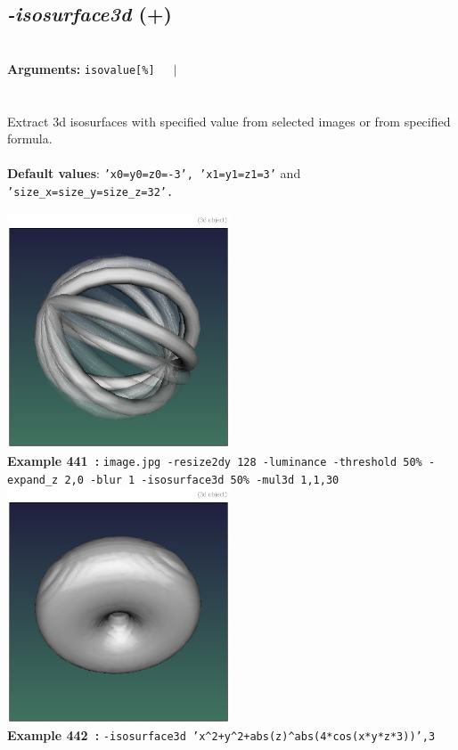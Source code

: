 \documentclass[a4paper,11pt,twoside]{book}
\begin{document}
\subsection{\emph{-isosurface3d} (+)}\vspace*{-0.5em}
~\\\textbf{Arguments: } 
{\small \texttt{isovalue[\%]}}~~~$|$\\
\\~\\
Extract 3d isosurfaces with specified value from selected images or from specified formula.
~\\~\\\textbf{Default values}: {\small \texttt{'x0=y0=z0=-3', 'x1=y1=z1=3'} and \texttt{'size\_x=size\_y=size\_z=32'.}}
\begin{center}\includegraphics[keepaspectratio=true,height=7cm,width=\textwidth]{img/gmic_def441.jpg}\\
{\footnotesize \textbf{Example 441~:} \texttt{image.jpg -resize2dy 128 -luminance -threshold 50\% -expand\_z 2,0 -blur 1 -isosurface3d 50\% -mul3d 1,1,30}}
\\\includegraphics[keepaspectratio=true,height=7cm,width=\textwidth]{img/gmic_def442.jpg}\\
{\footnotesize \textbf{Example 442~:} \texttt{-isosurface3d 'x\textasciicircum 2+y\textasciicircum 2+abs(z)\textasciicircum abs(4*cos(x*y*z*3))',3}}
\end{center}
\end{document}
